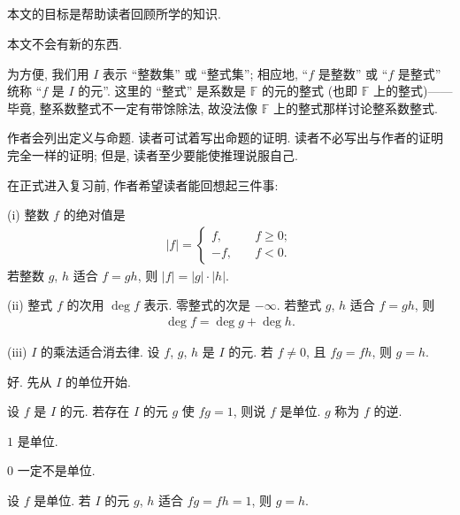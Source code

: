 \subsection*{}

本文的目标是帮助读者回顾所学的知识.

本文不会有新的东西.

为方便, 我们用 $I$ 表示 ``整数集'' 或 ``整式集''; 相应地, ``$f$ 是整数'' 或 ``$f$ 是整式'' 统称 ``$f$ 是 $I$ 的元''. 这里的 ``整式'' 是系数是 $\mathbb{F}$ 的元的整式 (也即 $\mathbb{F}$ 上的整式)——毕竟, 整系数整式不一定有带馀除法, 故没法像 $\mathbb{F}$ 上的整式那样讨论整系数整式.

作者会列出定义与命题. 读者可试着写出命题的证明. 读者不必写出与作者的证明完全一样的证明; 但是, 读者至少要能使推理说服自己.

在正式进入复习前, 作者希望读者能回想起三件事:

(i) 整数 $f$ 的绝对值是
\begin{align*}
    |f| = \begin{cases}
        f,  & \quad f \geq 0; \\
        -f, & \quad f < 0.
    \end{cases}
\end{align*}
若整数 $g$, $h$ 适合 $f = gh$, 则 $|f| = |g| \cdot |h|$.

(ii) 整式 $f$ 的次用 $\deg f$ 表示. 零整式的次是 $-\infty$. 若整式 $g$, $h$ 适合 $f = gh$, 则
\begin{align*}
    \deg f = \deg g + \deg h.
\end{align*}

(iii) $I$ 的乘法适合消去律. 设 $f$, $g$, $h$ 是 $I$ 的元. 若 $f \neq 0$, 且 $fg = fh$, 则 $g = h$.

好. 先从 $I$ 的单位开始.

\begin{definition}
    设 $f$ 是 $I$ 的元. 若存在 $I$ 的元 $g$ 使 $fg = 1$, 则说 $f$ 是单位. $g$ 称为 $f$ 的逆.
\end{definition}

\begin{proposition}
    $1$ 是单位.
\end{proposition}

\begin{proposition}
    $0$ 一定不是单位.
\end{proposition}

\begin{proposition}
    设 $f$ 是单位. 若 $I$ 的元 $g$, $h$ 适合 $fg = fh = 1$, 则 $g = h$.
\end{proposition}

